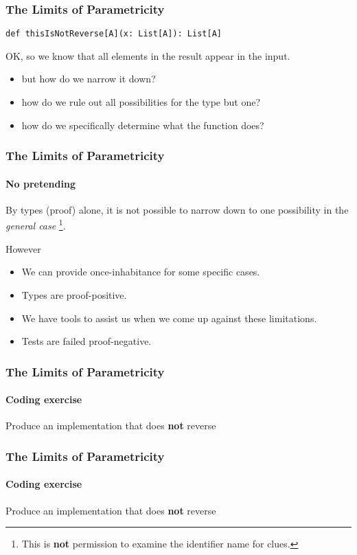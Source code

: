 \begin{frame}[fragile]
\frametitle{The Limits of Parametricity}
\begin{lstlisting}[style=scala]
def thisIsNotReverse[A](x: List[A]): List[A]
\end{lstlisting}
OK, so we know that all elements in the result appear in the input.
\begin{itemize}
 \item but how do we narrow it down?
 \item how do we rule out all possibilities for the type but one?
 \item how do we specifically determine what the function does?
\end{itemize}
\end{frame}

\begin{frame}[fragile]
\frametitle{The Limits of Parametricity}
\framesubtitle{No pretending}
By types (proof) alone, it is not possible to narrow down to one possibility in
the \emph{general case} \footnote{This is \textbf{not} permission to examine the
identifier name for clues.}.
\begin{block}{However}
\begin{itemize}
  \item We can provide once-inhabitance for some specific cases.
  \item Types are proof-positive.
  \item We have tools to assist us when we come up against these limitations.
  \item Tests are failed proof-negative.
\end{itemize}
\end{block}
\end{frame}

\begin{frame}[fragile]
\frametitle{The Limits of Parametricity}
\framesubtitle{Coding exercise}
\begin{block}{Produce an implementation that does \textbf{not} reverse}

\end{block}
\end{frame}

\begin{frame}[fragile]
\frametitle{The Limits of Parametricity}
\framesubtitle{Coding exercise}
\begin{block}{Produce an implementation that does \textbf{not} reverse}

\end{block}
\end{frame}

